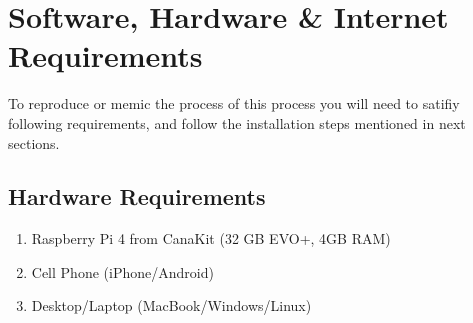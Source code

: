 \section{Software, Hardware \& Internet Requirements}	\label{sec:setup}
	To reproduce or memic the process of this process you will need to satifiy following requirements, and follow the installation steps mentioned in next sections. 
	\subsection{Hardware Requirements}	\label{subsec:hardware}
		\begin{enumerate}
			\item Raspberry Pi 4 from CanaKit (32 GB EVO+, 4GB RAM)
			\item Cell Phone (iPhone/Android)
			\item Desktop/Laptop (MacBook/Windows/Linux)
		\end{enumerate}
